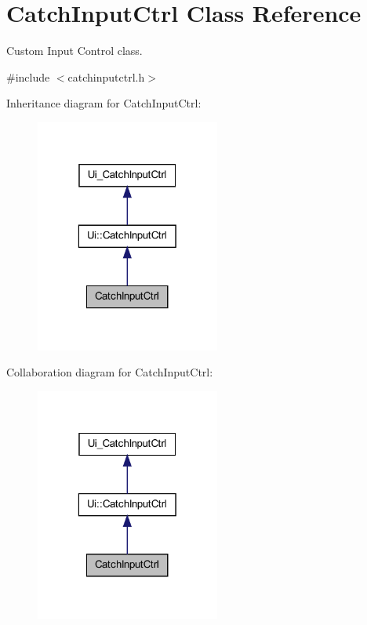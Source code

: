 \hypertarget{class_catch_input_ctrl}{
\section{CatchInputCtrl Class Reference}
\label{class_catch_input_ctrl}
}


Custom Input Control class.  




{\ttfamily \#include $<$catchinputctrl.h$>$}



Inheritance diagram for CatchInputCtrl:\nopagebreak
\begin{figure}[H]
\begin{center}
\leavevmode
\includegraphics[width=172pt]{class_catch_input_ctrl__inherit__graph}
\end{center}
\end{figure}


Collaboration diagram for CatchInputCtrl:\nopagebreak
\begin{figure}[H]
\begin{center}
\leavevmode
\includegraphics[width=172pt]{class_catch_input_ctrl__coll__graph}
\end{center}
\end{figure}
